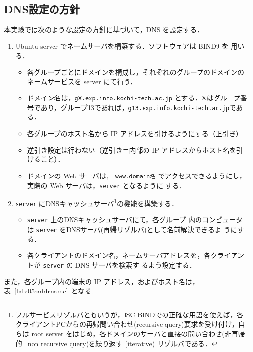 \subsection*{DNS設定の方針}
本実験では次のような設定の方針に基づいて，DNS を設定する．
\begin{enumerate}
 \item Ubuntu server でネームサーバを構築する．ソフトウェアは BIND9 を
       用いる．
       \begin{itemize}
	\item 各グループごとにドメインを構成し，それぞれのグループのドメインの
	      ネームサービスを server にて行う．
	\item ドメイン名は，\texttt{gX.exp.info.kochi-tech.ac.jp} とする．Xはグループ番号であり，グループ13であれば，\texttt{g13.exp.info.kochi-tech.ac.jp}である．
	\item 各グループのホスト名から IP アドレスを引けるようにする（正引き）
	\item 逆引き設定は行わない（逆引き＝内部の IP アドレスからホスト名を引けること）．
	\item ドメインの Web サーバは，
	      \texttt{www.domain名} でアクセスできるようにし，
	      実際の Web サーバは，\texttt{server} となるように
	      する．
       \end{itemize}
    \item \texttt{server} にDNSキャッシュサーバ\footnote{フルサービスリゾルバともいうが，ISC BINDでの正確な用語を使えば，各クライアントPCからの再帰問い合わせ(recursive query)要求を受け付け，自らは root server をはじめ，各ドメインのサーバと直接の問い合わせ(非再帰的=non recursive query)を繰り返す (iterative) リゾルバである．}の機能を構築する．
		\begin{itemize}
        \item \texttt{server} 上のDNSキャッシュサーバにて，各グループ
	      内のコンピュータは \texttt{server} をDNSサーバ(再帰リゾルバ)として名前解決できるよ
	      うにする．
		 \item 各クライアントのドメイン名，ネームサーバアドレスを，各クライアントが \texttt{server} の DNS サーバを検索す
		       るよう設定する．
		\end{itemize}
\end{enumerate}

また，各グループ内の端末の IP アドレス，およびホスト名は，
表~\ref{tab:05:addrname}~となる．

